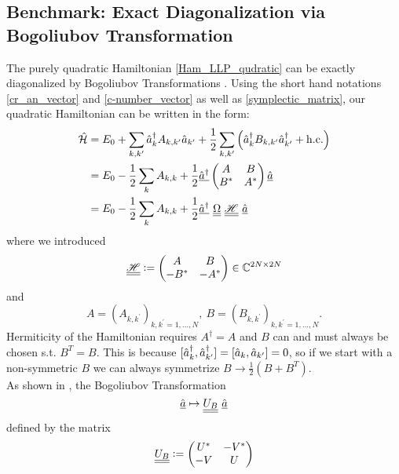 \subsection{Benchmark: Exact Diagonalization via Bogoliubov Transformation}
The purely quadratic Hamiltonian \ref{Ham_LLP_qudratic} can be exactly diagonalized by Bogoliubov Transformations \cite{PracticalTraining,1980ZPhyB..38..271H,PhysRevA.98.033610}. Using the short hand notations \ref{cr_an_vector} and \ref{c-number_vector} as well as \ref{symplectic_matrix}, our quadratic Hamiltonian can be written in the form:
\begin{align}
\ham &= E_0 + \Sum_{k,k^\prime}\CR_k A_{k,k^\prime}\AN_{k^\prime}+\frac12\Sum_{k,k^\prime}\left(\CR_k B_{k,k^\prime}\CR_{k^\prime}+\mathrm{h.c.}\right)\\
&=E_0-\frac12\Sum_k A_{k,k}+\frac12\underline\CR\begin{pmatrix}A & B\\ B^* & A^*\end{pmatrix}\underline\AN\\
&=E_0-\frac12\Sum_k A_{k,k}+\frac12\underline{\CR}\ {\underline{\underline{\Omega}}}\ {\underline{\underline{\mathscr{H}}}}\ {\underline{\AN}}
\end{align}
where we introduced
\begin{equation}
{\underline{\underline{\mathscr{H}}}}\vcentcolon=\begin{pmatrix}A & B\\ -B^* & -A^*\end{pmatrix}\in\mathbb{C}^{2N\times 2N}
\end{equation}
and
\begin{equation}
A=\left(A_{k,k^\prime}\right)_{k,k^\prime=1,...,N},\ B=\left(B_{k,k^\prime}\right)_{k,k^\prime=1,...,N}.
\end{equation}
Hermiticity of the Hamiltonian requires $A^\dagger=A$ and $B$ can and must always be chosen s.t. $B^T=B$. This is because $[\hat a^\dagger_k,\hat a^\dagger_{k^\prime}]=[\hat a_k,\hat a_{k^\prime}]=0$, so if we start with a non-symmetric $B$ we can always symmetrize $B\rightarrow \frac12\left(B+B^T\right)$.\\
As shown in \cite{PracticalTraining, 1980ZPhyB..38..271H}, the Bogoliubov Transformation
\begin{equation}\label{Bogoliubov Transformation Def} \underline\AN\mapsto  \underline{\underline{U_B}}\ \underline\AN\end{equation}
defined by the matrix 
\begin{equation}\label{symplectic_U_B}
\underline{\underline{U_B}}\vcentcolon= \begin{pmatrix}U^* & -V^*\\ -V & U\end{pmatrix}
\end{equation}
